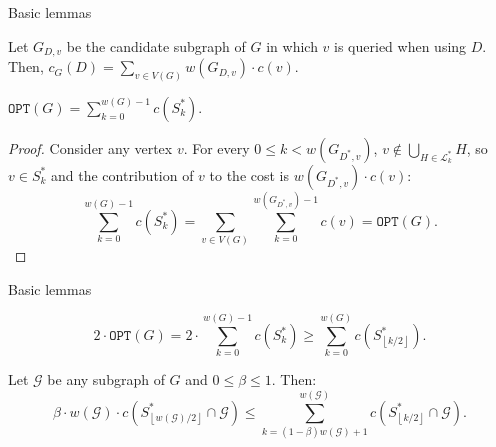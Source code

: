\documentclass{beamer}
\newcommand{\br}[1]{\mathopen{}\left( #1 \right)}
\newcommand{\fl}[1]{\mathopen{}\left\lfloor #1 \right\rfloor}
\newcommand{\OPT}{\texttt{OPT}}
\begin{document}
\begin{frame}{Basic lemmas}
\begin{lemma}\label{contributionLemma}
Let $G_{D,v}$ be the candidate subgraph of $G$ in which 
$v$ is queried when using $D$. Then,
$
c_G\br{D} = \sum_{v \in V\br{G}} w\br{G_{D,v}} \cdot c\br{v}.
$
\end{lemma}
    \pause
\begin{lemma}
    $\OPT\br{G}=\sum_{k=0}^{w\br{G}-1}c\br{S_{k}^*}.$
    \pause
    \begin{proof}
        Consider any vertex $v$. For every $0\leq k<w\br{G_{D^*,v}}$, $v\notin \bigcup_{H\in \mathcal{L}_{k}^*}H$, so $v\in S_{k}^*$ and the contribution of $v$ to the cost is $w\br{G_{D^*,v}}\cdot c\br{v}$:
        $$\sum_{k=0}^{w\br{G}-1}c\br{S_{k}^*}=\sum_{v\in V\br{G}}\sum_{k=0}^{w\br{G_{D^*,v}}-1}c\br{v}=\OPT\br{G}.$$
    \end{proof}
\end{lemma}
\end{frame}

    


\begin{frame}{Basic lemmas}
\begin{lemma}\label{lb_opt}
    $$
    2\cdot\OPT\br{G}= 2\cdot\sum_{k=0}^{w\br{G}-1}c\br{S_{k}^*} \geq \sum_{k=0}^{w\br{G}}c\br{S_{\fl{k/2}}^*}.
    $$
\end{lemma}
    \pause
\begin{lemma}\label{splitting}
    Let $\mathcal{G}$ be any subgraph of $G$ and $0\leq\beta\leq 1$. Then: 
            $$
           \beta\cdot w\br{\mathcal{G}}\cdot c\br{S_{\fl{w\br{\mathcal{G}}/2}}^*\cap \mathcal{G}}
            \leq \sum_{k=\br{1-\beta}w\br{\mathcal{G}}+1}^{w\br{\mathcal{G}}}c\br{S_{\fl{k/2}}^*\cap \mathcal{G}}.
            $$
\end{lemma}
\end{frame}
\end{document}
